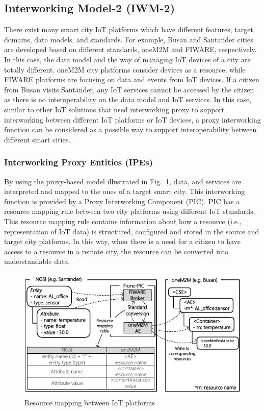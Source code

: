 \subsection{Interworking Model-2 (IWM-2)}
There exist many smart city IoT platforms which have different features, target domains, data models, and standards. For example, Busan and Santander cities are developed based on different standards, oneM2M and FIWARE, respectively. In this case, the data model and the way of managing IoT devices of a city are totally different. oneM2M city platforms consider devices as a resource, while FIWARE platforms are focusing on data and events from IoT devices. If a citizen from Busan visits Santander, any IoT services cannot be accessed by the citizen as there is no interoperability on the data model and IoT services. In this case, similar to other IoT solutions that used interworking proxy to support interworking between different IoT platforms or IoT devices, a proxy interworking function can be considered as a possible way to support interoperability between different smart cities.

\subsubsection{Interworking Proxy Entities (IPEs)}
By using the proxy-based model illustrated in Fig.~\ref{fig:resource_mapping_iot_platforms}, data, and services are interpreted and mapped to the ones of a target smart city. This interworking function is provided by a Proxy Interworking Component (PIC). PIC has a resource mapping rule between two city platforms using different IoT standards.
This resource mapping rule contains information about how a resource (i.e., representation of IoT data) is structured, configured and stored in the source and target city platforms. In this way, when there is a need for a citizen to have access to a resource in a remote city, the resource can be converted into understandable data.

\begin{figure}[H]			%
	\centering
	\includegraphics[width=\textwidth]{figures/fig_iwm_2_proxy_interworking.pdf}
    \caption{Resource mapping between IoT platforms}
    \label{fig:resource_mapping_iot_platforms}
\end{figure}

